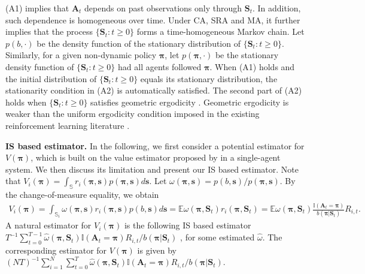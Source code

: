 \documentclass{article}
\newcommand{\Mean}{{\mathbb{E}}}
\begin{document}
(A1) implies that $\bm{A}_{t}$ depends on past observations only through $\bm{S}_{t}$. In addition, such dependence is homogeneous over time. Under CA, SRA and MA, it further implies that the process $\{\bm{S}_t:t\ge 0\}$ forms a time-homogeneous Markov chain. Let $p(b,\cdot)$ be the density function of the stationary distribution of $\{\bm{S}_t:t\ge 0\}$. Similarly, for a given non-dynamic policy $\bm{\pi}$, let $p(\bm{\pi},\cdot)$ be the stationary density function of $\{\bm{S}_{t}:t\ge 0\}$ had all agents followed $\bm{\pi}$. When (A1) holds and the initial distribution of $\{\bm{S}_t:t\ge 0\}$ equals its stationary distribution, the stationarity condition in (A2) is automatically satisfied. The second part of (A2) holds when $\{\bm{S}_t:t\ge 0\}$ satisfies geometric ergodicity \citep[see Theorem 3.7 of][]{Bradley2005}.  Geometric ergodicity
is weaker than the uniform ergodicity condition imposed in the existing reinforcement learning literature \citep{bhattacharya2019causal,zou2019}.


\textbf{IS based estimator.} In the following, we first consider a potential estimator for $V(\bm{\pi})$, which is built on the value estimator proposed by \cite{liu2018} in a single-agent system. We then discuss its limitation and present our IS based estimator. Note that $V_i(\bm{\pi})=\int_{\mathbb{S}} r_i(\bm{\pi},\bm{s})p(\bm{\pi},\bm{s})d\bm{s}$. Let $\omega(\bm{\pi},\bm{s})=p(b,\bm{s})/p(\bm{\pi},\bm{s})$. By the change-of-measure equality, we obtain
\vspace*{-0.1cm}
\begin{eqnarray}\label{eqn:valueliu2018}
	V_i(\bm{\pi})=\int_{\mathbb{S}_i} \omega(\bm{\pi},\bm{s})r_i(\bm{\pi},\bm{s})p(b,\bm{s})d\bm{s}=\Mean \omega(\bm{\pi}, \bm{S}_t) r_i(\bm{\pi},\bm{S}_t) 
	=\Mean \omega(\bm{\pi}, \bm{S}_t) \frac{\mathbb{I}(\bm{A}_t=\bm{\pi})}{b(\bm{\pi}|\bm{S}_t)} R_{i,t}.	
\end{eqnarray}
A natural estimator for $V_i(\bm{\pi})$ is the following IS based estimator
	$T^{-1}\sum_{t=0}^{T-1} \widehat{\omega}(\bm{\pi}, \bm{S}_{t}) \mathbb{I}(\bm{A}_t=\bm{\pi})R_{i,t}/b(\bm{\pi}|\bm{S}_t)$ ,
for some estimated $\widehat{\omega}$. The corresponding estimator for $V(\bm{\pi})$ is given by $(NT)^{-1} \sum_{i=1}^N \sum_{t=0}^{T} \widehat{\omega}(\bm{\pi}, \bm{S}_{t}) \mathbb{I}(\bm{A}_t=\bm{\pi})R_{i,t}/b(\bm{\pi}|\bm{S}_t)$. %
\end{document}
